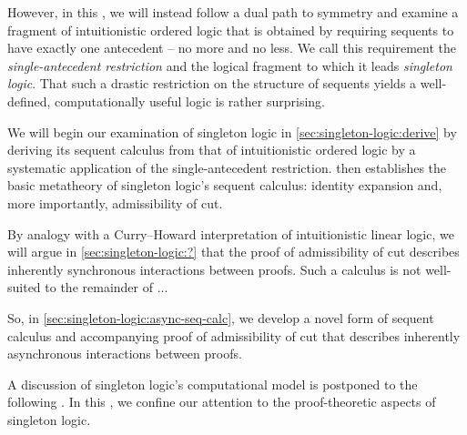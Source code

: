 However, in this , we will instead follow a dual path to symmetry and examine a fragment of intuitionistic ordered logic that is obtained by requiring sequents to have exactly one antecedent -- no more and no less.
We call this requirement the \emph{single-antecedent restriction} and the logical fragment to which it leads \emph{singleton logic}.
That such a drastic restriction on the structure of sequents yields a well-defined, computationally useful logic is rather surprising.

We will begin our examination of singleton logic in \cref{sec:singleton-logic:derive} by deriving its sequent calculus from that of intuitionistic ordered logic by a systematic application of the single-antecedent restriction.
 then establishes the basic metatheory of singleton logic's sequent calculus: identity expansion and, more importantly, admissibility of cut.

By analogy with a Curry--Howard interpretation of intuitionistic linear logic\autocite{Toninho:?}, we will argue in \cref{sec:singleton-logic:?} that the proof of admissibility of cut describes inherently synchronous interactions between proofs.
Such a calculus is not well-suited to the remainder of ...

So, in \cref{sec:singleton-logic:async-seq-calc}, we develop a novel form of sequent calculus and accompanying proof of admissibility of cut that describes inherently asynchronous interactions between proofs.

A discussion of singleton logic's computational model is postponed to the following .
In this , we confine our attention to the proof-theoretic aspects of singleton logic.






